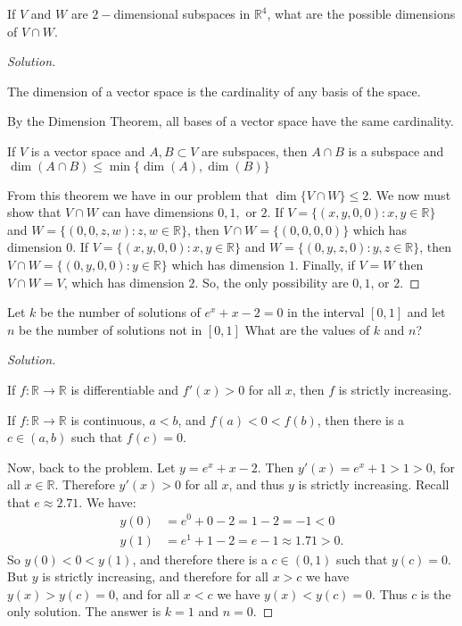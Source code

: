 \documentclass[crop=false,class=book,oneside]{standalone}
\begin{document}
\begin{problem}
If $V$ and $W$ are $2-$dimensional subspaces in $\mathbb{R}^4$, what are the possible dimensions of $V\cap W$.
\end{problem}
\begin{proof}[Solution]
\begin{definition*}
The dimension of a vector space is the cardinality of any basis of the space. 
\end{definition*}
\begin{remark*}
By the Dimension Theorem, all bases of a vector space have the same cardinality.
\end{remark*}
\begin{theorem*}
If $V$ is a vector space and $A,B\subset V$ are subspaces, then $A\cap B$ is a subspace and $\dim(A\cap B) \leq \min\{\dim(A),\dim(B)\}$
\end{theorem*}
From this theorem we have in our problem that $\dim\{V\cap W\} \leq 2$. We now must show that $V\cap W$ can have dimensions $0,1,$ or $2$. If $V = \{(x,y,0,0):x,y\in \mathbb{R}\}$ and $W = \{(0,0,z,w):z,w\in \mathbb{R}\}$, then $V\cap W = \{(0,0,0,0)\}$ which has dimension $0$. If $V = \{(x,y,0,0):x,y\in \mathbb{R}\}$ and $W = \{(0,y,z,0):y,z\in \mathbb{R}\}$, then $V\cap W = \{(0,y,0,0):y\in \mathbb{R}\}$ which has dimension $1$. Finally, if $V=W$ then $V\cap W = V$, which has dimension $2$. So, the only possibility are $0,1$, or $2$.
\end{proof}
\begin{problem}
Let $k$ be the number of solutions of $e^x+x-2 = 0$ in the interval $[0,1]$ and let $n$ be the number of solutions not in $[0,1]$ What are the values of $k$ and $n$?
\end{problem}
\begin{proof}[Solution]
\begin{theorem*}
If $f:\mathbb{R}\rightarrow \mathbb{R}$ is differentiable and $f'(x) >0$ for all $x$, then $f$ is strictly increasing.
\end{theorem*}
\begin{theorem*}
If $f:\mathbb{R}\rightarrow \mathbb{R}$ is continuous, $a<b$, and $f(a)<0<f(b)$, then there is a $c\in (a,b)$ such that $f(c) = 0$.
\end{theorem*}
Now, back to the problem. Let $y=e^x+x-2$. Then $y'(x) = e^x+1 > 1 > 0$, for all $x\in \mathbb{R}$. Therefore $y'(x)>0$ for all $x$, and thus $y$ is strictly increasing. Recall that $e\approx 2.71$. We have:
\begin{align*}
    y(0) &= e^0 + 0 - 2 = 1-2 = -1 <0 \\
    y(1) &= e^1+1-2 = e-1 \approx 1.71 > 0.
\end{align*}
So $y(0)<0<y(1)$, and therefore there is a $c\in (0,1)$ such that $y(c) = 0$. But $y$ is strictly increasing, and therefore for all $x>c$ we have $y(x)>y(c) = 0$, and for all $x<c$ we have $y(x)<y(c) = 0$. Thus $c$ is the only solution. The answer is $k=1$ and $n=0$.
\end{proof}
\end{document}
